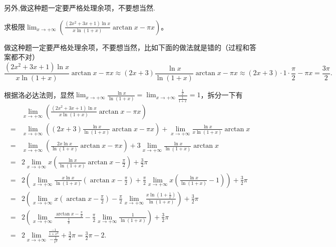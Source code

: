\documentclass[../../main.tex]{subfiles}%
\begin{document}
\begin{remark}
另外,做这种题一定要严格处理余项，不要想当然.
\end{remark}
\begin{example}
求极限\(\lim_{x\rightarrow +\infty}\left(\frac{(2x^2 + 3x + 1)\ln x}{x\ln(1 + x)}\arctan x-\pi x\right)\)。
\end{example}
\begin{remark}
做这种题一定要严格处理余项，不要想当然，比如下面的做法就是错的（过程和答案都不对）
\[\frac{(2x^2 + 3x + 1)\ln x}{x\ln(1 + x)}\arctan x-\pi x\approx(2x + 3)\frac{\ln x}{\ln(1 + x)}\arctan x-\pi x\approx(2x + 3)\cdot1\cdot\frac{\pi}{2}-\pi x=\frac{3\pi}{2}.\]
\end{remark}
\begin{solution}
根据洛必达法则，显然\(\lim_{x\rightarrow +\infty}\frac{\ln x}{\ln(1 + x)}=\lim_{x\rightarrow +\infty}\frac{\frac{1}{x}}{\frac{1}{1 + x}} = 1\)，拆分一下有
\begin{align*}
&\lim_{x\rightarrow +\infty}\left(\frac{(2x^2 + 3x + 1)\ln x}{x\ln(1 + x)}\arctan x-\pi x\right)\\
=&\lim_{x\rightarrow +\infty}\left((2x + 3)\frac{\ln x}{\ln(1 + x)}\arctan x-\pi x\right)+\lim_{x\rightarrow +\infty}\frac{\ln x}{x\ln(1 + x)}\arctan x\\
=&\lim_{x\rightarrow +\infty}\left(\frac{2x\ln x}{\ln(1 + x)}\arctan x-\pi x\right)+3\lim_{x\rightarrow +\infty}\frac{\ln x}{\ln(1 + x)}\arctan x\\
=&2\lim_{x\rightarrow +\infty}x\left(\frac{\ln x}{\ln(1 + x)}\arctan x-\frac{\pi}{2}\right)+\frac{3}{2}\pi\\
=&2\left(\lim_{x\rightarrow +\infty}\frac{x\ln x}{\ln(1 + x)}\left(\arctan x-\frac{\pi}{2}\right)+\frac{\pi}{2}\lim_{x\rightarrow +\infty}x\left(\frac{\ln x}{\ln(1 + x)}-1\right)\right)+\frac{3}{2}\pi\\
=&2\left(\lim_{x\rightarrow +\infty}x\left(\arctan x-\frac{\pi}{2}\right)-\frac{\pi}{2}\lim_{x\rightarrow +\infty}\frac{x\ln(1 + \frac{1}{x})}{\ln(1 + x)}\right)+\frac{3}{2}\pi\\
=&2\left(\lim_{x\rightarrow +\infty}\frac{\arctan x-\frac{\pi}{2}}{\frac{1}{x}}-\frac{\pi}{2}\lim_{x\rightarrow +\infty}\frac{1}{\ln(1 + x)}\right)+\frac{3}{2}\pi\\
=&2\lim_{x\rightarrow +\infty}\frac{\frac{-1}{1 + x^2}}{-\frac{1}{x^2}}+\frac{3}{2}\pi=\frac{3}{2}\pi - 2.
\end{align*}

\end{solution}
\end{document}
